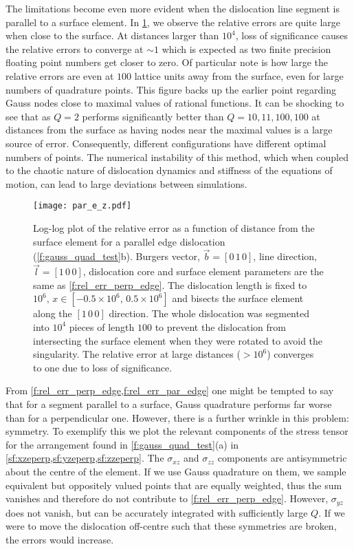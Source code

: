 The limitations become even more evident when the dislocation line segment is parallel to a surface element. In \cref{f:rel_err_par_edge}, we observe the relative errors are quite large when close to the surface. At distances larger than $10^4$, loss of significance causes the relative errors to converge at $\sim 1$ which is expected as two finite precision floating point numbers get closer to zero. Of particular note is how large the relative errors are even at $100$ lattice units away from the surface, even for large numbers of quadrature points. This figure backs up the earlier point regarding Gauss nodes close to maximal values of rational functions. It can be shocking to see that as $Q = 2$ performs significantly better than $Q = 10, 11, 100, 100$ at distances from the surface as having nodes near the maximal values is a large source of error. Consequently, different configurations have different optimal numbers of points. The numerical instability of this method, which when coupled to the chaotic nature of dislocation dynamics and stiffness of the equations of motion, can lead to large deviations between simulations.
\begin{figure}
  \centering
  \texttt{[image: par\_e\_z.pdf]}
  \caption[Relative error for an edge dislocation parallel to a surface element.]{Log-log plot of the relative error as a function of distance from the surface element for a parallel edge dislocation (\cref{f:gauss_quad_test}b). Burgers vector, $\vec{b} = [0\, 1\, 0]$, line direction, $\vec{l} = [1\, 0\, 0]$, dislocation core and surface element parameters are the same as \cref{f:rel_err_perp_edge}. The dislocation length is fixed to $10^{6},\, x\in\left[-0.5\times10^{6},\, 0.5\times10^{6} \right]$ and bisects the surface element along the $[1\, 0\, 0]$ direction. The whole dislocation was segmented into $10^4$ pieces of length $100$ to prevent the dislocation from intersecting the surface element when they were rotated to avoid the singularity. The relative error at large distances ($>10^6$) converges to one due to loss of significance.}
  \label{f:rel_err_par_edge}
\end{figure}

From \cref{f:rel_err_perp_edge,f:rel_err_par_edge} one might be tempted to say that for a segment parallel to a surface, Gauss quadrature performs far worse than for a perpendicular one. However, there is a further wrinkle in this problem: symmetry. To exemplify this we plot the relevant components of the stress tensor for the arrangement found in \cref{f:gauss_quad_test}(a) in \cref{sf:xzeperp,sf:yzeperp,sf:zzeperp}. The $\sigma_{xz}$ and $\sigma_{zz}$ components are antisymmetric about the centre of the element. If we use Gauss quadrature on them, we sample equivalent but oppositely valued points that are equally weighted, thus the sum vanishes and therefore do not contribute to \cref{f:rel_err_perp_edge}. However, $\sigma_{yz}$ does not vanish, but can be accurately integrated with sufficiently large $Q$. If we were to move the dislocation off-centre such that these symmetries are broken, the errors would increase.

